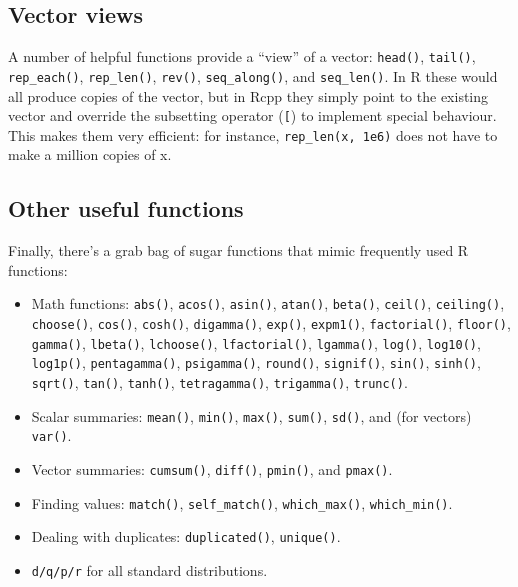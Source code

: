 \hypertarget{vector-views}{%
\subsection{Vector views}\label{vector-views}}

A number of helpful functions provide a ``view'' of a vector:
\texttt{head()}, \texttt{tail()}, \texttt{rep\_each()},
\texttt{rep\_len()}, \texttt{rev()}, \texttt{seq\_along()}, and
\texttt{seq\_len()}. In R these would all produce copies of the vector,
but in Rcpp they simply point to the existing vector and override the
subsetting operator (\texttt{{[}}) to implement special behaviour. This
makes them very efficient: for instance, \texttt{rep\_len(x,\ 1e6)} does
not have to make a million copies of x.

\hypertarget{other-useful-functions}{%
\subsection{Other useful functions}\label{other-useful-functions}}

Finally, there's a grab bag of sugar functions that mimic frequently
used R functions:

\begin{itemize}
\item
  Math functions: \texttt{abs()}, \texttt{acos()}, \texttt{asin()},
  \texttt{atan()}, \texttt{beta()}, \texttt{ceil()}, \texttt{ceiling()},
  \texttt{choose()}, \texttt{cos()}, \texttt{cosh()},
  \texttt{digamma()}, \texttt{exp()}, \texttt{expm1()},
  \texttt{factorial()}, \texttt{floor()}, \texttt{gamma()},
  \texttt{lbeta()}, \texttt{lchoose()}, \texttt{lfactorial()},
  \texttt{lgamma()}, \texttt{log()}, \texttt{log10()}, \texttt{log1p()},
  \texttt{pentagamma()}, \texttt{psigamma()}, \texttt{round()},
  \texttt{signif()}, \texttt{sin()}, \texttt{sinh()}, \texttt{sqrt()},
  \texttt{tan()}, \texttt{tanh()}, \texttt{tetragamma()},
  \texttt{trigamma()}, \texttt{trunc()}.
\item
  Scalar summaries: \texttt{mean()}, \texttt{min()}, \texttt{max()},
  \texttt{sum()}, \texttt{sd()}, and (for vectors) \texttt{var()}.
\item
  Vector summaries: \texttt{cumsum()}, \texttt{diff()}, \texttt{pmin()},
  and \texttt{pmax()}.
\item
  Finding values: \texttt{match()}, \texttt{self\_match()},
  \texttt{which\_max()}, \texttt{which\_min()}.
\item
  Dealing with duplicates: \texttt{duplicated()}, \texttt{unique()}.
\item
  \texttt{d/q/p/r} for all standard distributions.
\end{itemize}

